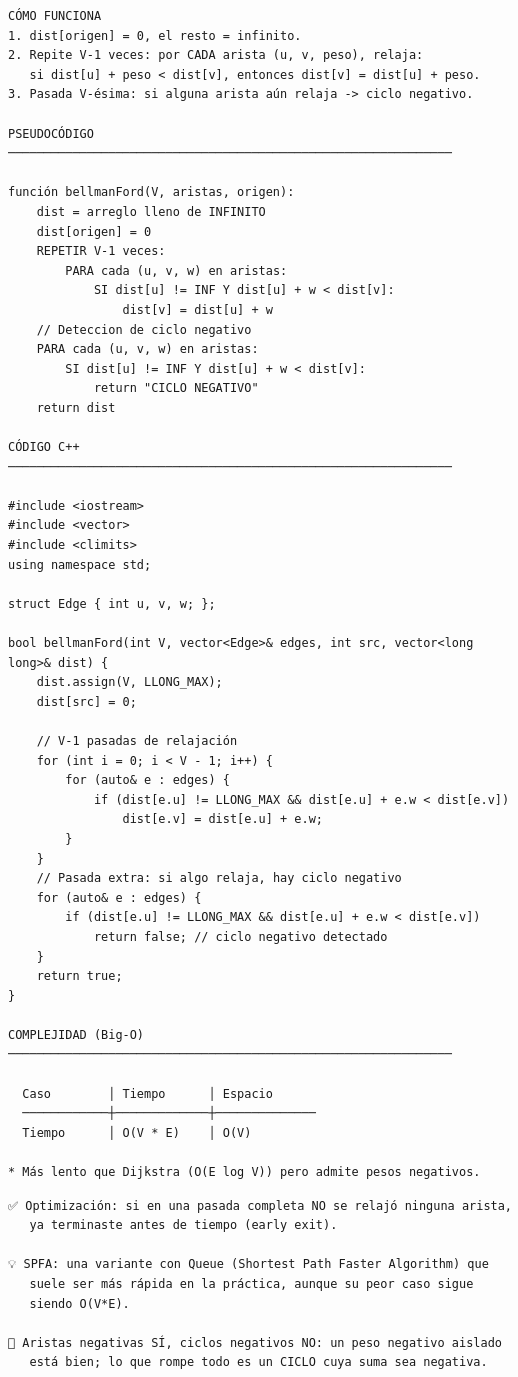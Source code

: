 \begin{lstlisting}
CÓMO FUNCIONA
1. dist[origen] = 0, el resto = infinito.
2. Repite V-1 veces: por CADA arista (u, v, peso), relaja:
   si dist[u] + peso < dist[v], entonces dist[v] = dist[u] + peso.
3. Pasada V-ésima: si alguna arista aún relaja -> ciclo negativo.

PSEUDOCÓDIGO
──────────────────────────────────────────────────────────────

función bellmanFord(V, aristas, origen):
    dist = arreglo lleno de INFINITO
    dist[origen] = 0
    REPETIR V-1 veces:
        PARA cada (u, v, w) en aristas:
            SI dist[u] != INF Y dist[u] + w < dist[v]:
                dist[v] = dist[u] + w
    // Deteccion de ciclo negativo
    PARA cada (u, v, w) en aristas:
        SI dist[u] != INF Y dist[u] + w < dist[v]:
            return "CICLO NEGATIVO"
    return dist

CÓDIGO C++
──────────────────────────────────────────────────────────────

#include <iostream>
#include <vector>
#include <climits>
using namespace std;

struct Edge { int u, v, w; };

bool bellmanFord(int V, vector<Edge>& edges, int src, vector<long long>& dist) {
    dist.assign(V, LLONG_MAX);
    dist[src] = 0;

    // V-1 pasadas de relajación
    for (int i = 0; i < V - 1; i++) {
        for (auto& e : edges) {
            if (dist[e.u] != LLONG_MAX && dist[e.u] + e.w < dist[e.v])
                dist[e.v] = dist[e.u] + e.w;
        }
    }
    // Pasada extra: si algo relaja, hay ciclo negativo
    for (auto& e : edges) {
        if (dist[e.u] != LLONG_MAX && dist[e.u] + e.w < dist[e.v])
            return false; // ciclo negativo detectado
    }
    return true;
}

COMPLEJIDAD (Big-O)
──────────────────────────────────────────────────────────────

  Caso        │ Tiempo      │ Espacio
  ────────────┼─────────────┼──────────────
  Tiempo      │ O(V * E)    │ O(V)

* Más lento que Dijkstra (O(E log V)) pero admite pesos negativos.
\end{lstlisting}

\begin{lstlisting}
✅ Optimización: si en una pasada completa NO se relajó ninguna arista,
   ya terminaste antes de tiempo (early exit).

💡 SPFA: una variante con Queue (Shortest Path Faster Algorithm) que
   suele ser más rápida en la práctica, aunque su peor caso sigue
   siendo O(V*E).

🔑 Aristas negativas SÍ, ciclos negativos NO: un peso negativo aislado
   está bien; lo que rompe todo es un CICLO cuya suma sea negativa.
\end{lstlisting}

